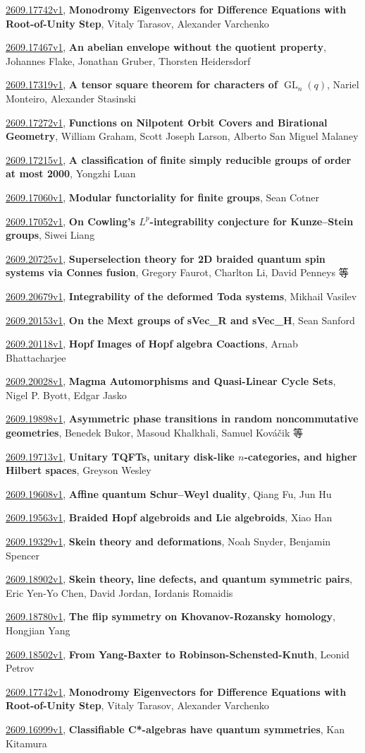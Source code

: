\documentclass[9pt, a4paper]{article}
\theoremstyle{plain}
\theoremstyle{definition}
\theoremstyle{remark}
\newcommand{\arxiv}[3]{\href{https://arxiv.org/abs/#1}{#1}, \textbf{\textcolor{arxivblue}{#2}}, #3}
\begin{document}
\arxiv{2609.17742v1}{Monodromy Eigenvectors for Difference Equations with Root-of-Unity Step}{Vitaly Tarasov, Alexander Varchenko}

\arxiv{2609.17467v1}{An abelian envelope without the quotient property}{Johannes Flake, Jonathan Gruber, Thorsten Heidersdorf}

\arxiv{2609.17319v1}{A tensor square theorem for characters of $\operatorname{GL}_{n}(q)$}{Nariel Monteiro, Alexander Stasinski}

\arxiv{2609.17272v1}{Functions on Nilpotent Orbit Covers and Birational Geometry}{William Graham, Scott Joseph Larson, Alberto San Miguel Malaney}

\arxiv{2609.17215v1}{A classification of finite simply reducible groups of order at most 2000}{Yongzhi Luan}

\arxiv{2609.17060v1}{Modular functoriality for finite groups}{Sean Cotner}

\arxiv{2609.17052v1}{On Cowling's $L^p$-integrability conjecture for Kunze--Stein groups}{Siwei Liang}

\arxiv{2609.20725v1}{Superselection theory for 2D braided quantum spin systems via Connes fusion}{Gregory Faurot, Charlton Li, David Penneys 等}

\arxiv{2609.20679v1}{Integrability of the deformed Toda systems}{Mikhail Vasilev}

\arxiv{2609.20153v1}{On the Mext groups of sVec_R and sVec_H}{Sean Sanford}

\arxiv{2609.20118v1}{Hopf Images of Hopf algebra Coactions}{Arnab Bhattacharjee}

\arxiv{2609.20028v1}{Magma Automorphisms and Quasi-Linear Cycle Sets}{Nigel P. Byott, Edgar Jasko}

\arxiv{2609.19898v1}{Asymmetric phase transitions in random noncommutative geometries}{Benedek Bukor, Masoud Khalkhali, Samuel Kováčik 等}

\arxiv{2609.19713v1}{Unitary TQFTs, unitary disk-like $n$-categories, and higher Hilbert spaces}{Greyson Wesley}

\arxiv{2609.19608v1}{Affine quantum Schur--Weyl duality}{Qiang Fu, Jun Hu}

\arxiv{2609.19563v1}{Braided Hopf algebroids and Lie algebroids}{Xiao Han}

\arxiv{2609.19329v1}{Skein theory and deformations}{Noah Snyder, Benjamin Spencer}

\arxiv{2609.18902v1}{Skein theory, line defects, and quantum symmetric pairs}{Eric Yen-Yo Chen, David Jordan, Iordanis Romaidis}

\arxiv{2609.18780v1}{The flip symmetry on Khovanov-Rozansky homology}{Hongjian Yang}

\arxiv{2609.18502v1}{From Yang-Baxter to Robinson-Schensted-Knuth}{Leonid Petrov}

\arxiv{2609.17742v1}{Monodromy Eigenvectors for Difference Equations with Root-of-Unity Step}{Vitaly Tarasov, Alexander Varchenko}

\arxiv{2609.16999v1}{Classifiable C*-algebras have quantum symmetries}{Kan Kitamura}

\end{document}
